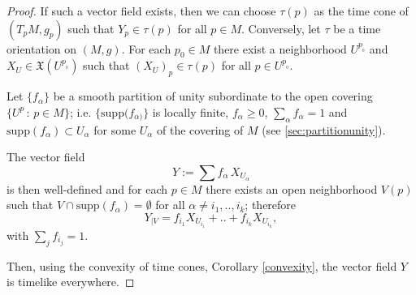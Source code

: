 \begin{proof}
    If such a vector field exists, then we can choose $\tau(p)$ as the time cone of $(T_pM,g_p)$ such that $Y_p\in \tau(p)$ for all $p\in M$. Conversely, let $\tau$ be a time orientation on $(M,g)$. For each $p_0 \in M$ there exist a neighborhood $U^{p_{_0}}$ and $X_U\in \mathfrak{X}(U^{p_{_0}})$ such that $(X_U)_p \in \tau(p)$ for all $p\in U^{p_{_0}}$.

    Let $\{f_{\alpha}\}$ be a smooth partition of unity subordinate to the open covering $\{U^p\, : \, p\in M\}$; i.e. $\{\mathrm{supp}(f_{\alpha)}\}$ is locally finite, $f_{\alpha}\geq 0$, $\sum_{\alpha} f_{\alpha}=1$ and $\mathrm{supp}(f_{\alpha}) \subset U_{\alpha}$ for some $U_{\alpha}$ of the covering of $M$ (see \autoref{sec:partitionunity}).

    The vector field $$Y:=\sum f_{\alpha}\, X_{U_{\alpha}}$$ is then well-defined and for each $p\in M$ there exists an open neighborhood $V(p)$ such that $V \cap \mathrm{supp}(f_{\alpha}) = \emptyset$ for all $\alpha \neq i_1,..,i_k$; therefore
    \[
        Y_{\mid V}=f_{i_1}X_{U_{i_1}}+..+f_{i_k}X_{U_{i_k}},
    \]
    with $\sum_j f_{i_j}=1$.

    Then, using the convexity of time cones, Corollary \ref{convexity}, the vector field $Y$ is timelike everywhere.
\end{proof}



